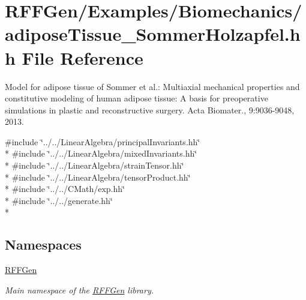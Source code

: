 \hypertarget{adiposeTissue__SommerHolzapfel_8hh}{\section{R\-F\-F\-Gen/\-Examples/\-Biomechanics/adipose\-Tissue\-\_\-\-Sommer\-Holzapfel.hh File Reference}
\label{adiposeTissue__SommerHolzapfel_8hh}
}


Model for adipose tissue of Sommer et al.\-: Multiaxial mechanical properties and constitutive modeling of human adipose tissue\-: A basis for preoperative simulations in plastic and reconstructive surgery. Acta Biomater., 9\-:9036-\/9048, 2013.  


{\ttfamily \#include \char`\"{}../../\-Linear\-Algebra/principal\-Invariants.\-hh\char`\"{}}\\*
{\ttfamily \#include \char`\"{}../../\-Linear\-Algebra/mixed\-Invariants.\-hh\char`\"{}}\\*
{\ttfamily \#include \char`\"{}../../\-Linear\-Algebra/strain\-Tensor.\-hh\char`\"{}}\\*
{\ttfamily \#include \char`\"{}../../\-Linear\-Algebra/tensor\-Product.\-hh\char`\"{}}\\*
{\ttfamily \#include \char`\"{}../../\-C\-Math/exp.\-hh\char`\"{}}\\*
{\ttfamily \#include \char`\"{}../../generate.\-hh\char`\"{}}\\*
\subsection*{Namespaces}
\begin{DoxyCompactItemize}
\item 
\hyperlink{namespaceRFFGen}{R\-F\-F\-Gen}
\begin{DoxyCompactList}\small\item\em Main namespace of the \hyperlink{namespaceRFFGen}{R\-F\-F\-Gen} library. \end{DoxyCompactList}\end{DoxyCompactItemize}
